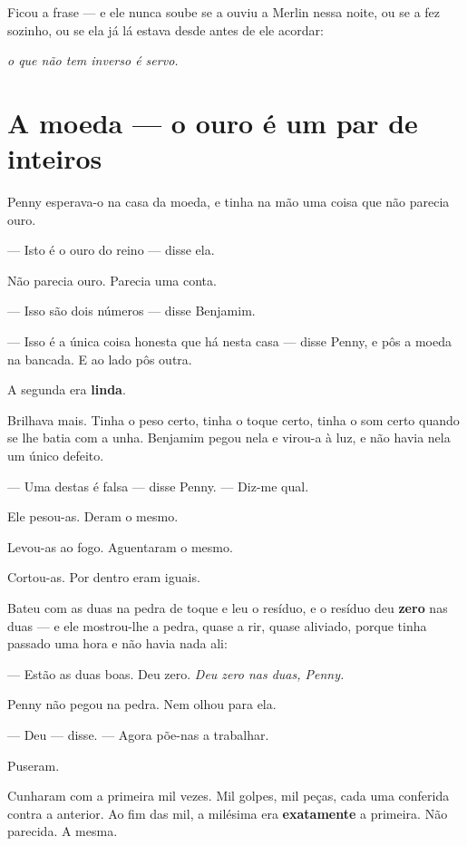 \documentclass[livro.tex]{subfiles}
\begin{document}
\medskip

Ficou a frase --- e ele nunca soube se a ouviu a Merlin nessa noite, ou se a fez sozinho, ou se ela já lá estava
desde antes de ele acordar:

\begin{center}\itshape
o que não tem inverso é servo.
\end{center}


\chapter{A moeda --- o ouro é um par de inteiros}

Penny esperava-o na casa da moeda, e tinha na mão uma coisa que não parecia ouro.

--- Isto é o ouro do reino --- disse ela.

Não parecia ouro. Parecia uma conta.

--- Isso são dois números --- disse Benjamim.

--- Isso é a única coisa honesta que há nesta casa --- disse Penny, e pôs a moeda na bancada. E ao lado pôs outra.

A segunda era \textbf{linda}.

Brilhava mais. Tinha o peso certo, tinha o toque certo, tinha o som certo quando se lhe batia com a unha. Benjamim
pegou nela e virou-a à luz, e não havia nela um único defeito.

--- Uma destas é falsa --- disse Penny. --- Diz-me qual.

\medskip

Ele pesou-as. Deram o mesmo.

Levou-as ao fogo. Aguentaram o mesmo.

Cortou-as. Por dentro eram iguais.

Bateu com as duas na pedra de toque e leu o resíduo, e o resíduo deu \textbf{zero} nas duas --- e ele mostrou-lhe a
pedra, quase a rir, quase aliviado, porque tinha passado uma hora e não havia nada ali:

--- Estão as duas boas. Deu zero. \emph{Deu zero nas duas, Penny.}

Penny não pegou na pedra. Nem olhou para ela.

--- Deu --- disse. --- Agora põe-nas a trabalhar.

\medskip

Puseram.

Cunharam com a primeira mil vezes. Mil golpes, mil peças, cada uma conferida contra a anterior. Ao fim das mil, a
milésima era \textbf{exatamente} a primeira. Não parecida. A mesma.
\end{document}
